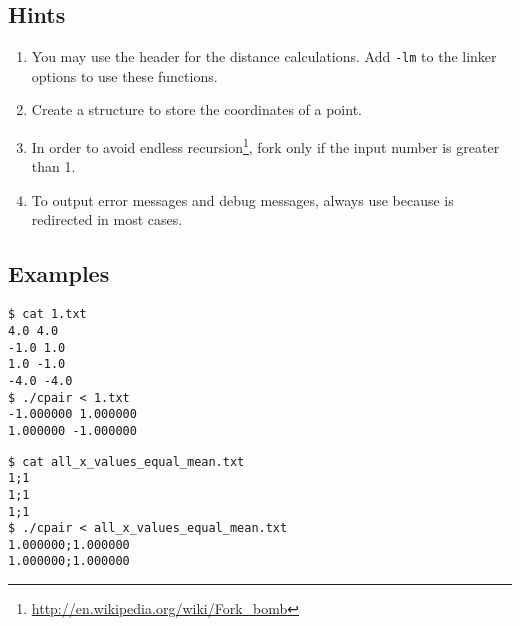\subsection*{Hints}
\begin{enumerate}
\item You may use the header  for the distance calculations.
Add \verb|-lm| to the linker options to use these functions.
\item Create a structure to store the coordinates of a point.
\item In order to avoid endless recursion\footnote{\url{http://en.wikipedia.org/wiki/Fork\_bomb}},
fork only if the input number is greater than 1.
\item To output error messages and debug messages, always use
 because  is redirected in most cases.
\end{enumerate}

\subsection*{Examples}
\begin{multicols}{2}
\begin{verbatim}
$ cat 1.txt
4.0 4.0
-1.0 1.0
1.0 -1.0
-4.0 -4.0
$ ./cpair < 1.txt
-1.000000 1.000000
1.000000 -1.000000
\end{verbatim}
\begin{verbatim}
$ cat all_x_values_equal_mean.txt
1;1
1;1
1;1
$ ./cpair < all_x_values_equal_mean.txt
1.000000;1.000000
1.000000;1.000000
\end{verbatim}
\end{multicols}

\osueguidelinestwo


